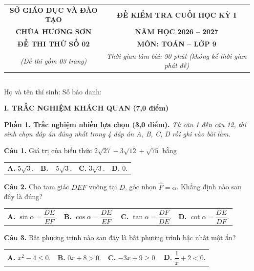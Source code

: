 \documentclass[11pt,a4paper]{article}
\begin{document}
\noindent
\begin{tabular*}{\linewidth}{@{\extracolsep{\fill}}cc@{}}
\textbf{SỞ GIÁO DỤC VÀ ĐÀO TẠO} & \textbf{ĐỀ KIỂM TRA CUỐI HỌC KỲ I} \\
\textbf{CHÙA HƯƠNG SƠN} & \textbf{NĂM HỌC 2026 -- 2027} \\
\textbf{ĐỀ THI THỬ SỐ 02} & \textbf{MÔN: TOÁN -- LỚP 9} \\
\textit{(Đề thi gồm 03 trang)} & \textit{Thời gian làm bài: 90 phút (không kể thời gian phát đề)} \\
\end{tabular*}

\vspace{2mm}
\noindent
\rule{\linewidth}{0.8pt}

\vspace{1mm}
\noindent
Họ và tên thí sinh: \dotfill Số báo danh: \dotfill

\vspace{2mm}
\noindent
\textbf{\large I. TRẮC NGHIỆM KHÁCH QUAN (7,0 điểm)}

\vspace{1mm}
\noindent
\textbf{Phần 1. Trắc nghiệm nhiều lựa chọn (3,0 điểm).} \textit{Từ câu 1 đến câu 12, thí sinh chọn đáp án đúng nhất trong 4 đáp án A, B, C, D rồi ghi vào bài làm.}

\vspace{1.5mm}
\textbf{Câu 1.} Giá trị của biểu thức $2\sqrt{27} - 3\sqrt{12} + \sqrt{75}$ bằng\\
\begin{tabularx}{\linewidth}{XXXX}
\textbf{A.} $5\sqrt{3}$. & \textbf{B.} $-5\sqrt{3}$. & \textbf{C.} $3\sqrt{3}$. & \textbf{D.} $0$.
\end{tabularx}

\vspace{1.5mm}
\textbf{Câu 2.} Cho tam giác $DEF$ vuông tại $D$, góc nhọn $\widehat{F} = \alpha$. Khẳng định nào sau đây là đúng?\\
\begin{tabularx}{\linewidth}{XXXX}
\textbf{A.} $\sin \alpha = \dfrac{DE}{EF}$. & \textbf{B.} $\cos \alpha = \dfrac{DE}{EF}$. & \textbf{C.} $\tan \alpha = \dfrac{DF}{DE}$. & \textbf{D.} $\cot \alpha = \dfrac{DE}{DF}$.
\end{tabularx}

\vspace{1.5mm}
\textbf{Câu 3.} Bất phương trình nào sau đây là bất phương trình bậc nhất một ẩn?\\
\begin{tabularx}{\linewidth}{XXXX}
\textbf{A.} $x^2 - 4 \le 0$. & \textbf{B.} $0x + 8 > 0$. & \textbf{C.} $-3x + 9 \ge 0$. & \textbf{D.} $\dfrac{1}{x} + 2 < 0$.
\end{tabularx}
\end{document}
